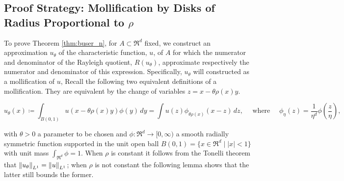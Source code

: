 \subsection{Proof Strategy: Mollification by Disks of Radius
  Proportional to \texorpdfstring{$\rho$}{rho}}
To prove Theorem \ref{thm:buser_n}, for $A \subset \Re^d$ fixed, we
construct an approximation $u_\theta$ of the characteristic function,
$u$, of $A$ for which the numerator and denominator of the Rayleigh
quotient, $R(u_\theta)$, approximate respectively the numerator and
denominator of this expression.  Specifically, $u_\theta$ will
constructed as a mollification of $u$, Recall the following two
equivalent definitions of a mollification.  They are equivalent by the
change of variables $z = x-\theta \rho(x) y$.

\begin{equation} \label{eqn:utheta}
u_\theta(x) 
\coloneqq \int_{B(0,1)} \!\!\! u(x-\theta \rho(x) y) \phi(y) \, dy
= \int \! u(z) \phi_{\theta \rho(x)}(x-z) \, dz,
\quad \text{ where } \quad
\phi_{\eta}(z) 
= \frac{1}{\eta^d} \phi\left(\frac{z}{\eta}\right),
\end{equation}

with $\theta > 0$ a parameter to be chosen and $\phi:\Re^d \rightarrow
[0,\infty)$ a smooth radially symmetric function supported in the unit
open ball $B(0,1)=\{x \in \Re^d \;| \; |x| < 1\}$ with unit mass
$\int_{\Re^d} \phi = 1$. When $\rho$ is constant it follows from the
Tonelli theorem that $\left\lVert u_\theta \right\rVert_{L^1} = \left\lVert u \right\rVert_{L^1}$; when $\rho$ is not
constant the following lemma shows that the latter still bounds the
former.

